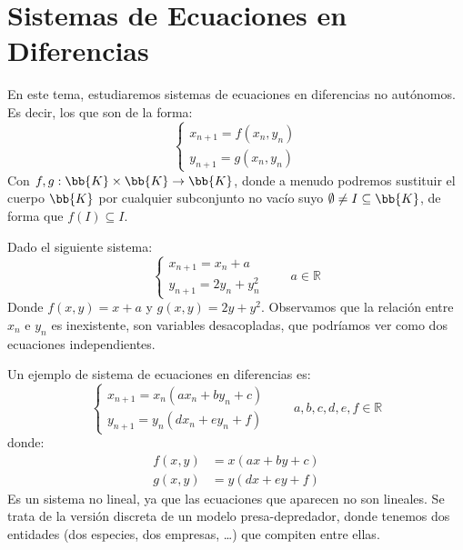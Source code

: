 \chapter{Sistemas de Ecuaciones en Diferencias}

En este tema, estudiaremos sistemas de ecuaciones en diferencias no autónomos. Es decir, los que son de la forma:
\begin{equation*}\label{eq:sistemas_eq_dif}
    \left\{ 
    \begin{array}{l}
        x_{n+1} = f(x_n, y_n) \\
        y_{n+1} = g(x_n, y_n)
    \end{array}
    \right.
\end{equation*}
Con $f,g:\bb{K}\times \bb{K}\to \bb{K}$, donde a menudo podremos sustituir el cuerpo $\bb{K}$ por cualquier subconjunto no vacío suyo $\emptyset \neq I \subseteq \bb{K}$, de forma que $f(I) \subseteq I$.

\begin{ejemplo}
    Dado el siguiente sistema:
    \begin{equation*}
        \left\{\begin{array}{l}
                x_{n+1} = x_n + a \\
                y_{n+1} = 2y_n + y_n^2
        \end{array}\right. \qquad a \in \mathbb{R}
    \end{equation*}
    Donde $f(x,y) = x+a$ y $g(x,y) = 2y + y^2$. 
   Observamos que la relación entre $x_n$ e $y_n$ es inexistente, son variables desacopladas, que podríamos ver como dos ecuaciones independientes.
\end{ejemplo}

\begin{ejemplo}
    Un ejemplo de sistema de ecuaciones en diferencias es:
    \begin{equation*}
        \left\{\begin{array}{l}
                x_{n+1} = x_{n}(ax_n + by_n + c) \\
                y_{n+1} = y_{n}(dx_n + ey_n + f)
        \end{array}\right. \qquad a,b,c,d,e,f \in \mathbb{R}
    \end{equation*}
    donde:
    \begin{align*}
        f(x,y) &= x(ax + by + c) \\
        g(x,y) &= y(dx + ey + f)
    \end{align*}
    Es un sistema no lineal, ya que las ecuaciones que aparecen no son lineales.
    Se trata de la versión discreta de un modelo presa-depredador, donde tenemos dos entidades (dos especies, dos empresas, \ldots) que compiten entre ellas.
\end{ejemplo}

